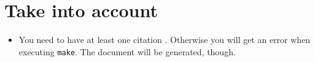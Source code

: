 
\section{Take into account}

\begin{itemize}
  \item You need to have at least one citation \cite{kr}. Otherwise you will get an error when executing \texttt{make}. The document will be generated, though.
\end{itemize}

